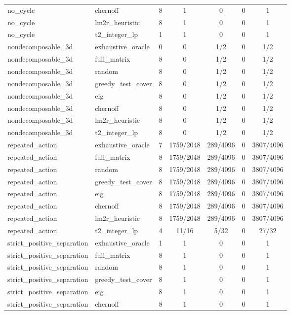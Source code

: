 \begin{table}[p]
\begin{tabular}{@{}llccccc@{}}
no\_cycle & chernoff & 8 & 1 & 0 & 0 & 1 \\
no\_cycle & lm2r\_heuristic & 8 & 1 & 0 & 0 & 1 \\
no\_cycle & t2\_integer\_lp & 1 & 1 & 0 & 0 & 1 \\
nondecomposable\_3d & exhaustive\_oracle & 0 & 0 & 1/2 & 0 & 1/2 \\
nondecomposable\_3d & full\_matrix & 8 & 0 & 1/2 & 0 & 1/2 \\
nondecomposable\_3d & random & 8 & 0 & 1/2 & 0 & 1/2 \\
nondecomposable\_3d & greedy\_test\_cover & 8 & 0 & 1/2 & 0 & 1/2 \\
nondecomposable\_3d & eig & 8 & 0 & 1/2 & 0 & 1/2 \\
nondecomposable\_3d & chernoff & 8 & 0 & 1/2 & 0 & 1/2 \\
nondecomposable\_3d & lm2r\_heuristic & 8 & 0 & 1/2 & 0 & 1/2 \\
nondecomposable\_3d & t2\_integer\_lp & 8 & 0 & 1/2 & 0 & 1/2 \\
repeated\_action & exhaustive\_oracle & 7 & 1759/2048 & 289/4096 & 0 & 3807/4096 \\
repeated\_action & full\_matrix & 8 & 1759/2048 & 289/4096 & 0 & 3807/4096 \\
repeated\_action & random & 8 & 1759/2048 & 289/4096 & 0 & 3807/4096 \\
repeated\_action & greedy\_test\_cover & 8 & 1759/2048 & 289/4096 & 0 & 3807/4096 \\
repeated\_action & eig & 8 & 1759/2048 & 289/4096 & 0 & 3807/4096 \\
repeated\_action & chernoff & 8 & 1759/2048 & 289/4096 & 0 & 3807/4096 \\
repeated\_action & lm2r\_heuristic & 8 & 1759/2048 & 289/4096 & 0 & 3807/4096 \\
repeated\_action & t2\_integer\_lp & 4 & 11/16 & 5/32 & 0 & 27/32 \\
strict\_positive\_separation & exhaustive\_oracle & 1 & 1 & 0 & 0 & 1 \\
strict\_positive\_separation & full\_matrix & 8 & 1 & 0 & 0 & 1 \\
strict\_positive\_separation & random & 8 & 1 & 0 & 0 & 1 \\
strict\_positive\_separation & greedy\_test\_cover & 8 & 1 & 0 & 0 & 1 \\
strict\_positive\_separation & eig & 8 & 1 & 0 & 0 & 1 \\
strict\_positive\_separation & chernoff & 8 & 1 & 0 & 0 & 1 \\

\end{tabular}
\end{table}
